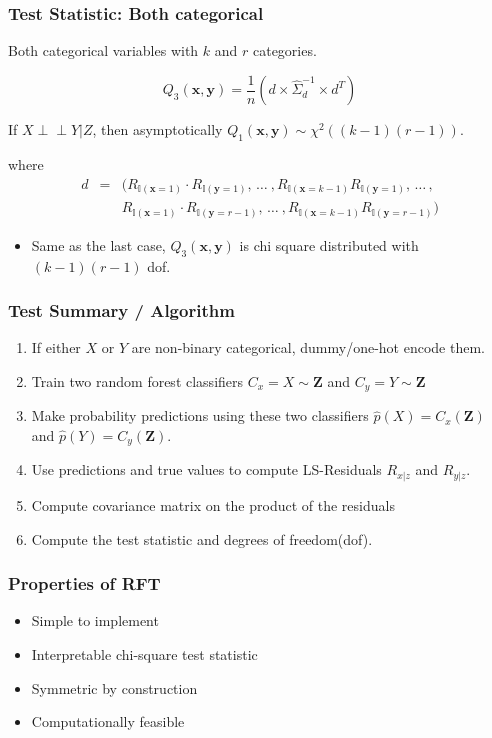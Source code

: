\documentclass{beamer}
\def\ci{\perp\!\!\!\!\!\perp}
\begin{document}
\begin{frame}
	\frametitle{Test Statistic: Both categorical}
	Both categorical variables with $ k $ and $ r $ categories.


	$$ Q_3(\bm{x}, \bm{y}) = \frac{1}{n} (d \times \hat{\Sigma}_d^{-1} \times d^T) $$

	If $ X \ci Y | Z $, then asymptotically $ Q_1(\bm{x}, \bm{y}) \sim
	\chi^2((k-1)(r-1)) $.

	where 
	\begin{eqnarray*}
		d &  =  & (R_{\mathbb{I}(\mathbf{x}=1)} \cdot R_{\mathbb{I}(\mathbf{y}=1)}, \, \ldots \ ,
		R_{\mathbb{I}(\mathbf{x}=k-1)} R_{\mathbb{I}(\mathbf{y}=1)}, \, \ldots \, ,
		\\
	 	& & R_{\mathbb{I}(\mathbf{x}=1)} \cdot R_{\mathbb{I}(\mathbf{y}=r-1)}, \, \ldots \ ,
		R_{\mathbb{I}(\mathbf{x}=k-1)} R_{\mathbb{I}(\mathbf{y}=r-1)}
		)
	\end{eqnarray*}
	\begin{itemize}
		\setlength\itemsep{1em}
		\item Same as the last case, $ Q_3(\bm{x}, \bm{y}) $ is chi square distributed 
			with $ (k-1)(r-1) $ dof.
	\end{itemize}
\end{frame}

\begin{frame}
	\frametitle{Test Summary / Algorithm}
	\begin{enumerate}
		\setlength\itemsep{1em}
		\item If either $ X $ or $ Y $ are non-binary categorical,
			dummy/one-hot encode them.
		\item Train two random forest classifiers $ C_x = X \sim \bm{Z} $ and
			$ C_y = Y \sim \bm{Z} $
		\item Make probability predictions using these two classifiers
			$ \hat{p}(X) = C_x(\bm{Z}) $ and $ \hat{p}(Y) =
			C_y(\bm{Z}) $.
		\item Use predictions and true values to compute LS-Residuals $ R_{x|z} $ and $ R_{y|z} $.	
		\item Compute covariance matrix on the product of the residuals
		\item Compute the test statistic and degrees of freedom(dof).
	\end{enumerate}
\end{frame}

\begin{frame}
	\frametitle{Properties of RFT}
	\begin{itemize}
		\setlength\itemsep{1em}
		\item Simple to implement
		\item Interpretable chi-square test statistic
		\item Symmetric by construction
		\item Computationally feasible
	\end{itemize}
\end{frame}
\end{document}
